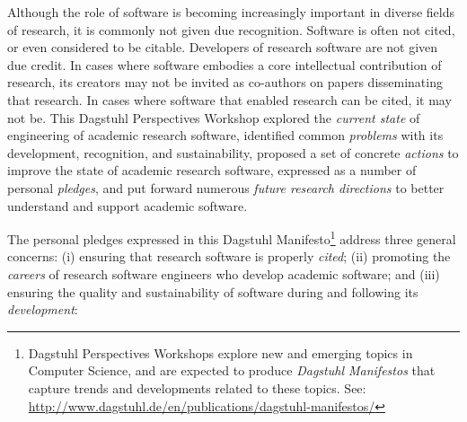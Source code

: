 \documentclass[a4paper,UKenglish]{dagman}
\begin{document}
Although the role of software is becoming increasingly important in diverse fields of research, it is commonly not given due recognition. Software is often not cited, or even considered to be citable. Developers of research software are not given due credit. In cases where software embodies a core intellectual contribution of research, its creators may not be invited as co-authors on papers disseminating that research. In cases where software that enabled research can be cited, it may not be.
This Dagstuhl Perspectives Workshop
explored the \emph{current state} of engineering of academic research software,
identified common \emph{problems} with its development, recognition, and sustainability,
proposed a set of concrete \emph{actions} to improve the state of academic research software, expressed as a number of personal \emph{pledges},
and
put forward numerous \emph{future research directions} to better understand and support academic software.

The personal pledges expressed in this Dagstuhl Manifesto\footnote{Dagstuhl Perspectives Workshops explore new and emerging topics in Computer Science, and are expected to produce \emph{Dagstuhl Manifestos} that capture trends and developments related to these topics. See: \url{http://www.dagstuhl.de/en/publications/dagstuhl-manifestos/}} address three general concerns:
(i) ensuring that research software is properly \emph{cited};
(ii) promoting the \emph{careers} of research software engineers who develop academic software;
and
(iii) ensuring the quality and sustainability of software during and following its \emph{development}:
\end{document}
